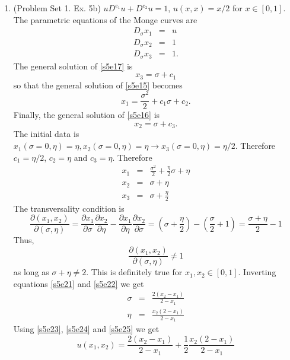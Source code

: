 \documentclass{article}
\newcommand{\pd}[2]{\frac{\partial{#1}}{\partial{#2}}}
\theoremstyle{plain}
\numberwithin{thm}{section}
\theoremstyle{plain}
\numberwithin{prop}{section}
\theoremstyle{definition}
\numberwithin{defn}{section}
\theoremstyle{remark}
\numberwithin{equation}{section}
\begin{document}
\begin{enumerate}
\item (Problem Set 1. Ex. 5b) $uD^{e_1}u + D^{e_2}u = 1$, $u(x, x) = x/2$ for $x \in [0, 1]$. The
parametric equations of the Monge curves are
\begin{eqnarray}
D_\sigma x_1 &=& u \label{s5e15} \\
D_\sigma x_2 &=& 1 \label{s5e16} \\
D_\sigma x_3 &=& 1 \label{s5e17}.
\end{eqnarray}
The general solution of \eqref{s5e17} is 
\begin{equation}\label{s5e18}
x_3 = \sigma + c_1
\end{equation}
so that the general solution of \eqref{s5e15} becomes 
\begin{equation}\label{s5e19}
x_1 = \frac{\sigma^2}{2} + c_1\sigma + c_2.
\end{equation}
Finally, the general solution of \eqref{s5e16} is
\begin{equation}\label{s5e20}
x_2 = \sigma + c_3.
\end{equation}
The initial data is $x_1(\sigma = 0, \eta) = \eta, x_2(\sigma = 0, \eta) = \eta \rightarrow 
x_3(\sigma = 0, \eta) = \eta/2$. Therefore $c_1 = \eta/2$, $c_2 = \eta$ and $c_3 = \eta$. Therefore
\begin{eqnarray}
x_1 &=& \frac{\sigma^2}{2} + \frac{\eta}{2}\sigma + \eta \label{s5e21} \\
x_2 &=& \sigma + \eta \label{s5e22} \\
x_3 &=& \sigma + \frac{\eta}{2} \label{s5e23}
\end{eqnarray}
The transversality condition is
\[
\frac{\partial(x_1, x_2)}{\partial(\sigma, \eta)} = \pd{x_1}{\sigma}\pd{x_2}{\eta} - 
\pd{x_1}{\eta}\pd{x_2}{\sigma} = \left(\sigma + \frac{\eta}{2}\right) - 
\left(\frac{\sigma}{2} + 1\right) = \frac{\sigma + \eta}{2} - 1
\]
Thus,
\[
\frac{\partial(x_1, x_2)}{\partial(\sigma, \eta)} \ne 1
\]
as long as $\sigma + \eta \ne 2$. This is definitely true for $x_1, x_2 \in [0, 1]$. Inverting
equations \eqref{s5e21} and \eqref{s5e22} we get
\begin{eqnarray}
\sigma &=& \frac{2(x_2 - x_1)}{2 - x_1} \label{s5e24} \\
\eta &=& \frac{x_2(2 - x_1)}{2 - x_1} \label{s5e25}
\end{eqnarray}
Using \eqref{s5e23}, \eqref{s5e24} and \eqref{s5e25} we get
\begin{equation}\label{s5e26}
u(x_1, x_2) = \frac{2(x_2 - x_1)}{2 - x_1} + \frac{1}{2}\frac{x_2(2 - x_1)}{2 - x_1}
\end{equation}


\end{enumerate}
\end{document}
